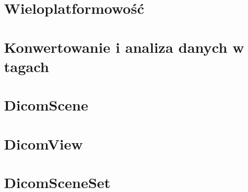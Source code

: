 
\section*{Wieloplatformowość}


\section*{Konwertowanie i analiza danych w tagach}


\section*{DicomScene}


\section*{DicomView}


\section*{DicomSceneSet}



